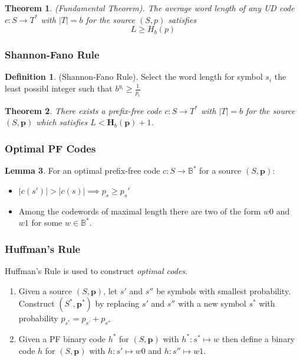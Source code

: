 \documentclass[a4paper]{article}
\newtheorem{theorem}{Theorem}
\theoremstyle{definition} \newtheorem*{definition}{Definition}
\newtheorem{lemma}[theorem]{Lemma}
\newcommand{\pr}{\bm{p}}
\newcommand{\B}{\mathbb{B}}
\begin{document}
\begin{theorem}
  (Fundamental Theorem). The average word length of any UD code 
  $c : S \rightarrow T^*$ with $|T|=b$ for the source $(S,p)$ satisfies
  \[
    \boxed{L \geq H_b(p)}
  \]
  \label{thm:fundamental}
\end{theorem}

\subsubsection*{Shannon-Fano Rule}
\begin{definition}
  (Shannon-Fano Rule). Select the word length for symbol $s_i$ the least
  possibl integer such that $b^{y_i}\geq \frac{1}{p_i}$
\end{definition}

\begin{theorem}
  There exists a prefix-free code $c:S \rightarrow T^*$ with $|T|=b$ for the
  source $(S,\bm{p})$ which satisfies $L < \bm{H}_b(\bm{p})+1$.
  \label{SF}
\end{theorem}

\subsubsection*{Optimal PF Codes}
\begin{lemma}
  For an optimal prefix-free code $c:S \rightarrow \B^*$ for a source
  $(S,\pr)$:
  \begin{itemize}
    \item $|c(s')| > |c(s)| \implies p_s \geq p_s'$
    \item Among the codewords of maximal length there are two of the form
      $w0$ and $w1$ for some $w \in \B^{*}$.
  \end{itemize}
  \label{optpf}
\end{lemma}

\subsubsection*{Huffman's Rule}
Huffman's Rule is used to construct \emph{optimal codes}.
\begin{enumerate}
  \item Given a source $(S,\pr)$, let $s'$ and $s''$ be symbols with 
    smallest probability. Construct $(S^*,\pr^*)$ by replacing $s'$ and
    $s''$ with a new symbol $s^*$ with probability 
    $p_{s^*}=p_{s'}+p_{s''}$
  \item Given a PF binary code $h^*$ for $(S,\pr)$ with 
    $h^*:s^*\mapsto w$ then define a binary code $h$ for $(S,\pr)$ with
    $h:s' \mapsto w0$ and $h : s'' \mapsto w1$.
\end{enumerate}
\end{document}
